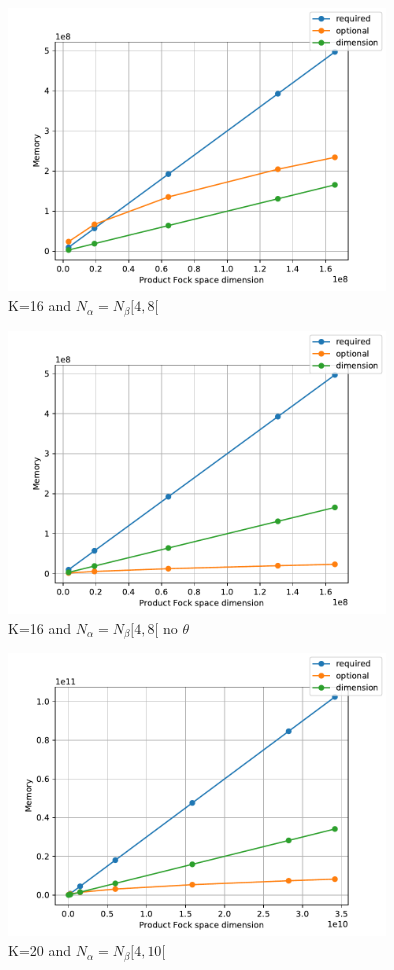 \begin{center}

\begin{figure}
  \centering
  \includegraphics[width=10cm]{graphs/K=16.pdf}
  \caption{K=16 and $N_\alpha = N_\beta [4,8[$}
  \label{}
\end{figure}

\begin{figure}
  \centering
  \includegraphics[width=10cm]{graphs/K=16_low.pdf}
  \caption{K=16 and $N_\alpha = N_\beta [4,8[$ no $\theta$}
  \label{}
\end{figure}

\begin{figure}
  \centering
  \includegraphics[width=10cm]{graphs/K=20.pdf}
  \caption{K=20 and $N_\alpha = N_\beta [4,10[$}
  \label{}
\end{figure}


\end{center}
